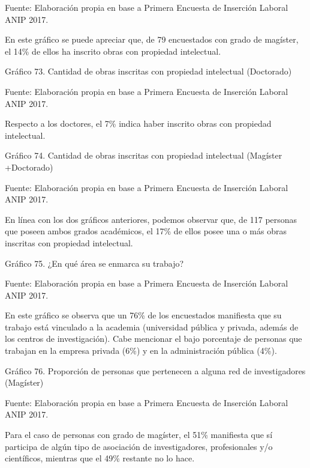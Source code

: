 \documentclass{article}
\begin{document}

Fuente: Elaboración propia en base a Primera Encuesta de Inserción Laboral ANIP 2017.

En este gráfico se puede apreciar que, de 79 encuestados con grado de magíster, el 14\% de ellos ha inscrito obras con propiedad intelectual.

Gráfico 73. Cantidad de obras inscritas con propiedad intelectual (Doctorado)


Fuente: Elaboración propia en base a Primera Encuesta de Inserción Laboral ANIP 2017.

Respecto a los doctores, el 7\% indica haber inscrito obras con propiedad intelectual.

Gráfico 74. Cantidad de obras inscritas con propiedad intelectual (Magíster +Doctorado)


Fuente: Elaboración propia en base a Primera Encuesta de Inserción Laboral ANIP 2017.

En línea con los dos gráficos anteriores, podemos observar que, de 117 personas que poseen ambos grados académicos, el 17\% de ellos posee una o más obras inscritas con propiedad intelectual.

Gráfico 75. ¿En qué área se enmarca su trabajo?


Fuente: Elaboración propia en base a Primera Encuesta de Inserción Laboral ANIP 2017.

En este gráfico se observa que un 76\% de los encuestados manifiesta que su trabajo está vinculado a la academia (universidad pública y privada, además de los centros de investigación). Cabe mencionar el bajo porcentaje de personas que trabajan en la empresa privada (6\%) y en la administración pública (4\%).

Gráfico 76. Proporción de personas que pertenecen a alguna red de investigadores (Magíster)


Fuente: Elaboración propia en base a Primera Encuesta de Inserción Laboral ANIP 2017.

Para el caso de personas con grado de magíster, el 51\% manifiesta que sí participa de algún tipo de asociación de investigadores, profesionales y/o científicos, mientras que el 49\% restante no lo hace.
\end{document}
